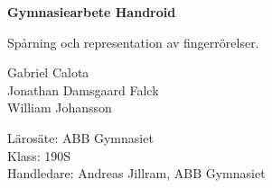 \begin{titlepage}
    \centering

    \vspace*{1cm}

    \begin{LARGE}
        \textbf{Gymnasiearbete Handroid}
    \end{LARGE}

    \begin{Large}
    
        \vspace{1cm}

        Spårning och representation av fingerrörelser. 

    \end{Large}
    
\vspace{1cm}

    \begin{large}
        Gabriel Calota\\
        Jonathan Damsgaard Falck\\
        William Johansson
    \end{large}

    \vfill

    \begin{large}
        Lärosäte: ABB Gymnasiet\\
        \vspace{0.5cm}
        Klass: 190S\\
        \vspace{0.5cm}
        Handledare: Andreas Jillram, ABB Gymnasiet
    \end{large}

\end{titlepage}